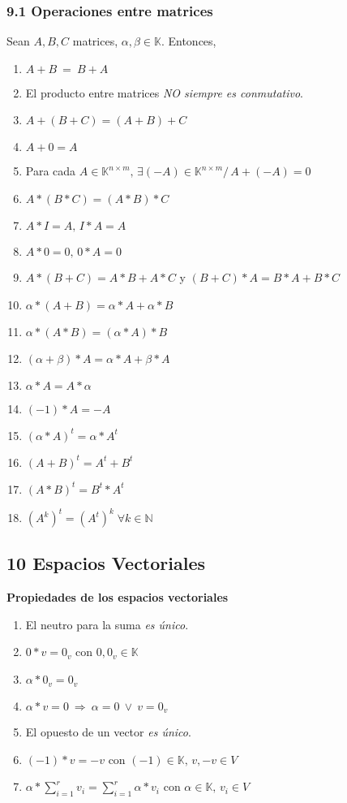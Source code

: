 \documentclass{article}
\newcommand{\comma}{,\,}                                %
\newcommand{\tq}{/\,}                                   %
\newcommand{\vees}{\:\vee\:}                            %
\newcommand{\eq}{\:=\:}                                 %
\newcommand{\naturales}{\mathbb{N}}                     %
\newcommand{\cuerpo}{\mathbb{K}}                        %
\newcommand{\Rightarrows}{\: \Rightarrow \:}            %
\newcommand{\sumatoria}[2]{\sum_{#1} ^{#2}}             %
\begin{document}
\subsubsection*{9.1 Operaciones entre matrices}
Sean $A,B,C$ matrices, $\alpha,\beta \in \cuerpo$. Entonces,
\begin{enumerate}
    \item $A+B\eq B+A$
    \item El producto entre matrices \emph{NO siempre es conmutativo}.
    \item $A+(B+C) = (A+B)+C$
    \item $A + 0 = A$
    \item Para cada $A \in \cuerpo^{n \times m} \comma \exists (-A) \in \cuerpo^{n \times m} \tq A+(-A)=0$
    \item $A*(B*C)=(A*B)*C$
    \item $A*I = A \comma I*A=A$
    \item $A*0=0 \comma 0*A=0$
    \item $A*(B+C) = A*B + A*C$ y $(B+C)*A = B*A + B*C$
    \item $\alpha*(A+B)=\alpha*A + \alpha *B$
    \item $\alpha * (A*B) = (\alpha*A)*B$
    \item $(\alpha + \beta) * A = \alpha * A + \beta * A$
    \item $\alpha * A = A * \alpha$
    \item $(-1)*A=-A$
    \item $(\alpha*A)^t = \alpha * A^t$
    \item $ (A+B)^t=A^t+B^t$
    \item $(A*B)^t = B^t * A^t$
    \item $(A^k)^t = (A^t)^k \; \forall k \in \naturales$
\end{enumerate}

\subsection*{10 Espacios Vectoriales}
\textbf{Propiedades de los espacios vectoriales}
\begin{enumerate}
    \item El neutro para la suma \emph{es único}.
    \item $0 * v = 0_v$ con $0,0_v \in \cuerpo$
    \item $\alpha * 0_v = 0_v$
    \item $\alpha * v = 0 \Rightarrows \alpha = 0 \vees v = 0_v$
    \item El opuesto de un vector \emph{es único}.
    \item $(-1) * v  = -v$ con $(-1) \in \cuerpo \comma v,-v \in V$
    \item $\alpha * \sumatoria{i=1}{r} v_i = \sumatoria{i=1}{r} \alpha * v_i$ con $\alpha \in \cuerpo \comma v_i \in V$
\end{enumerate}
\end{document}

